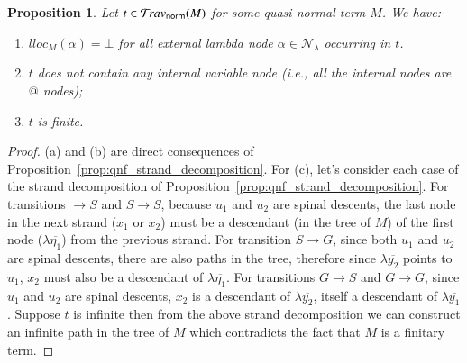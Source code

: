 \documentclass{elsarticle}
\makeatletter
\theoremstyle{plain}
\newtheorem{proposition}[theorem]{Proposition}
\theoremstyle{definition}
\newcommand\Nodes{\mathcal{N}}%
\newcommand\NodesLmd{\Nodes_\lambda}%
\newcommand{\normalizing}{{\sf norm}}
\newcommand{\travsetnorm}{\travset_\normalizing}
\renewcommand\ie{{\it i.e.\@\xspace}}
\makeatother
\begin{document}
\begin{proposition}
\label{prop:qnf_traversals_are_finite}
Let $t \in \travsetnorm(M)$ for some \emph{quasi normal} term $M$. We have:
\begin{enumerate}[label=(\alph*), nosep]
\item $lloc_M(\alpha) = \bot$ for all external lambda node $\alpha \in \NodesLmd$ occurring in $t$.
\item $t$ does not contain any internal variable node (\ie, all the internal nodes are $@$ nodes);
\item $t$ is finite.
\end{enumerate}
\end{proposition}
\begin{proof}
(a) and (b) are direct consequences of Proposition~\ref{prop:qnf_strand_decomposition}.
For (c), let's consider each case of the strand decomposition of Proposition~\ref{prop:qnf_strand_decomposition}. For transitions $\rightarrow S$ and $S \rightarrow S$, because $u_1$ and $u_2$ are spinal descents, the last node in the next strand ($x_1$ or $x_2$) must be a descendant (in the tree of $M$) of the first node ($\lambda\overline{\eta_1}$) from the previous strand.
For transition $S\rightarrow G$, since both $u_1$ and $u_2$ are spinal descents, there are also paths in the tree, therefore since $\lambda\overline{y_2}$ points to $u_1$, $x_2$ must also be a descendant of $\lambda\overline{\eta_1}$. For transitions $G \rightarrow S$ and $G \rightarrow G$, since $u_1$ and $u_2$ are spinal descents, $x_2$ is a descendant of $\lambda\overline{y_2}$, itself a descendant of $\lambda\overline{y_1}$.
Suppose $t$ is infinite then from the above strand decomposition we can construct an infinite path in the tree of $M$ which contradicts the fact that $M$ is a finitary term.
\end{proof}
\end{document}
